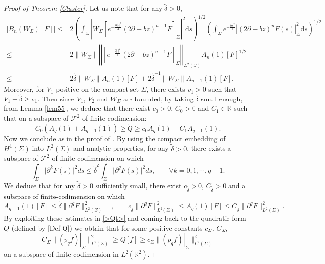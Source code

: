 \documentclass[11pt,a4paper,reqno,oneside]{amsproc}
\def \rr {{\mathbb R}}
\numberwithin{equation}{section}
\begin{document}
\begin{proof}[Proof of Theorem \ref{Cluster}]
Let us note that for any $\tilde\delta>0$,
\begin{align*}
|B_n(W_\Sigma)[F]|  \leq& 2  \left(  \int_{\Sigma} \left| W_\Sigma \left[ e^{-\frac{b|\cdot|^2}{4}} (2\partial-b\bar z)^{n-1} F \right]_\Sigma\right|^2 \mathrm{d} s \right)^{1/2}
\left( \int_{\Sigma} e^{-\frac{bs^2}{4}}  \left| (2\partial-b\bar z)^{n} F(s) \right|_\Sigma^2 \mathrm{d} s \right)^{1/2}\\
\leq & 2\| W_\Sigma \| \left|\left| \left[ e^{-\frac{b|\cdot|^2}{4}} (2\partial-b\bar z)^{n-1} F \right]_\Sigma\right|\right|_{L^2(\Sigma)} A_{n}(1)[F]^{1/2} \\
\leq&2\tilde\delta\| W_\Sigma \| A_n(1)[F]+2{\tilde\delta}^{-1} \| W_\Sigma \|A_{n-1}(1)[F].
\end{align*}
Moreover, for $V_1$ positive on the compact set $\Sigma$, there exists  $v_1>0$ such that  $V_1-\tilde\delta  \geq v_1$. 
Then since $V_1$, $V_2$ and $W_\Sigma$  are bounded, by taking 
$\tilde\delta$ small enough, from Lemma \ref{lem55}, we deduce that there exist $c_0>0$, $C_0>0$ and $C_1\in \rr$ such that  on a subspace of $\mathcal F^2$ of finite-codimension:
\begin{equation}\label{>Qt>}
C_0 ( A_q (1) + A_{q-1} (1)) \geq \widetilde Q \geq c_0 A_q (1) - C_1  A_{q-1} (1).
\end{equation}
Now we conclude as in the proof of \cite[Proposition 4.1]{PushRoz07}. By using the compact embedding of $H^1(\Sigma)$ into $L^2(\Sigma)$ and analytic properties, for any $\tilde\delta>0$, there exists a subspace of $\mathcal F^2$ of finite-codimension on which 
\[
\int_\Sigma  \Big| \partial^k F(s) \Big|^2 ds \leq \tilde\delta^2 \int_\Sigma  \Big| \partial^q F(s) \Big|^2 ds, \qquad \forall k=0,1,\cdots, q-1.
\]
We deduce that for any $\tilde\delta>0$ sufficiently small, there exist $c_{\tilde\delta}>0$, $C_{\tilde\delta}>0$ and a subspace of finite-codimension on which 
\[ 
A_{q-1} (1)[F] \leq \tilde\delta \| \partial^q F \|_{L^2(\Sigma)}^2 \quad , \qquad c_{\tilde\delta} \| \partial^q F \|_{L^2(\Sigma)}^2 \leq A_{q} (1)[F] \leq C_{\tilde\delta} \| \partial^q F \|_{L^2(\Sigma)}^2 .
\]
By exploiting these estimates in \eqref{>Qt>} and coming back to the quadratic form $Q$ (defined by \eqref{Def Q}) we obtain that for some positive constants $c_\Sigma$, $C_\Sigma$,
\begin{equation}\label{13nov25}
C_\Sigma \| \left.(p_q f)\right|_\Sigma\|_{L^2(\Sigma)}^2 \geq     Q[f] \geq  c_\Sigma \| \left.(p_q f)\right|_\Sigma\|_{L^2(\Sigma)}^2
\end{equation}
on a subspace of finite codimension in $L^2(\mathbb R^2)$.








\end{proof}
\end{document}
